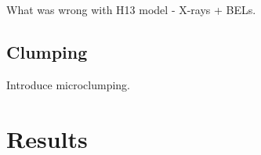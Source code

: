 \documentclass[useAMS,usenatbib]{mn2e_x}
\begin{document}
What was wrong with H13 model - X-rays + BELs.

\subsection{Clumping}

Introduce microclumping.









\clearpage

\section{Results}
\end{document}
